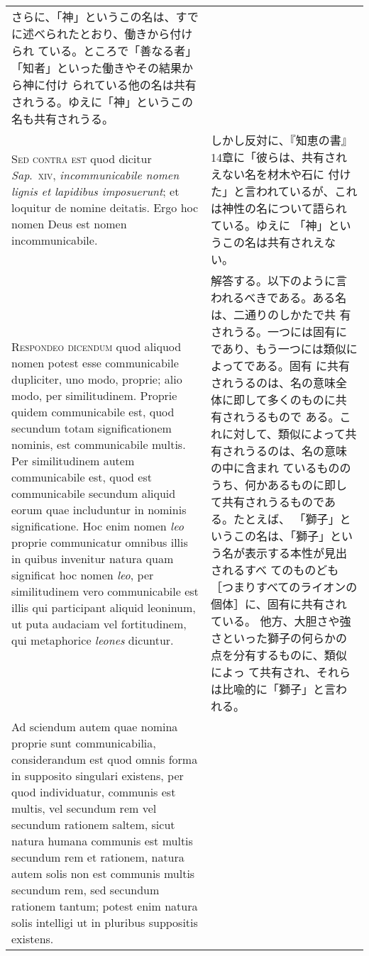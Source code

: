 \documentclass[10pt]{jsarticle}
\begin{document}
\begin{longtable}{p{21em}p{21em}}
さらに、「神」というこの名は、すでに述べられたとおり、働きから付けられ
ている。ところで「善なる者」「知者」といった働きやその結果から神に付け
られている他の名は共有されうる。ゆえに「神」というこの名も共有されうる。

\\

{\scshape Sed contra est} quod dicitur {\itshape Sap}.~{\scshape xiv},
{\itshape incommunicabile nomen lignis et lapidibus imposuerunt}; et
loquitur de nomine deitatis. Ergo hoc nomen Deus est nomen
incommunicabile.

&

しかし反対に、『知恵の書』14章に「彼らは、共有されえない名を材木や石に
付けた」と言われているが、これは神性の名について語られている。ゆえに
「神」というこの名は共有されえない。

\\

{\scshape Respondeo dicendum} quod aliquod nomen potest esse
communicabile dupliciter, uno modo, proprie; alio modo, per
similitudinem. Proprie quidem communicabile est, quod secundum totam
significationem nominis, est communicabile multis. Per similitudinem
autem communicabile est, quod est communicabile secundum aliquid eorum
quae includuntur in nominis significatione. Hoc enim nomen {\itshape
leo} proprie communicatur omnibus illis in quibus invenitur natura
quam significat hoc nomen {\itshape leo}, per similitudinem vero
communicabile est illis qui participant aliquid leoninum, ut puta
audaciam vel fortitudinem, qui metaphorice {\itshape leones} dicuntur.

&

解答する。以下のように言われるべきである。ある名は、二通りのしかたで共
有されうる。一つには固有にであり、もう一つには類似によってである。固有
に共有されうるのは、名の意味全体に即して多くのものに共有されうるもので
ある。これに対して、類似によって共有されうるのは、名の意味の中に含まれ
ているもののうち、何かあるものに即して共有されうるものである。たとえば、
「獅子」というこの名は、「獅子」という名が表示する本性が見出されるすべ
てのものども［つまりすべてのライオンの個体］に、固有に共有されている。
他方、大胆さや強さといった獅子の何らかの点を分有するものに、類似によっ
て共有され、それらは比喩的に「獅子」と言われる。

\\

Ad sciendum autem quae nomina proprie sunt communicabilia,
considerandum est quod omnis forma in supposito singulari existens,
per quod individuatur, communis est multis, vel secundum rem vel
secundum rationem saltem, sicut natura humana communis est multis
secundum rem et rationem, natura autem solis non est communis multis
secundum rem, sed secundum rationem tantum; potest enim natura solis
intelligi ut in pluribus suppositis existens.  &


\end{longtable}
\end{document}
